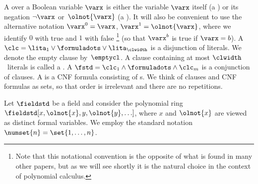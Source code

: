 A  over a Boolean variable $\varx$ is either
the variable 
$\varx$ itself (a 
)
or its negation $\lnot \varx$ or~$\olnot{\varx}$ (a
). It will also be convenient to use
the alternative notation $\varx^0=\varx$, $\varx^1=\olnot{\varx}$,
where we identify $0$ with true and $1$ with false%
\footnote{Note that 
this notational convention is 
the opposite of what is found in many other papers, but as we will see
shortly it is the natural choice in the  context of polynomial
calculus.} 
(so that $\varx^b$ is true if $\varx = b$).
%
A  $\clc = \lita_1 \lor \formuladots \lor
\lita_{\clwidth}$ is a disjunction of literals. We denote the empty
clause by~$\emptycl$.  A clause containing at most $\clwidth$~literals
is called a . A
 $\fstd = \clc_1 \land \formuladots \land
\clc_m$ is a conjunction of clauses. A \introduceterm{\kcnfform{}} is
a CNF formula consisting of \xclause{\clwidth}{}s.
We think of clauses and CNF formulas as sets, %
so that order is irrelevant  and there %
are   %
no repetitions.

Let $\fieldstd$ be a 
%
field and consider the polynomial ring
$\fieldstd[x, \olnot{x}, y, \olnot{y}, \ldots]$,
%
where 
$x$
and
$\olnot{x}$
are viewed
as distinct formal 
variables. 
%
We employ the standard notation $\numset{n} =
\set{1,\ldots,n}$.

